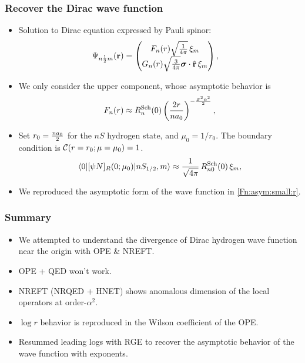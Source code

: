 \begin{frame}
	\frametitle{Recover the Dirac wave function}

	\begin{itemize}
		\item Solution to Dirac equation expressed by Pauli spinor: 
		\begin{align}
				\Psi_{n{1\over 2} m}(\vb{r}) & = \pmqty{ F_{n}(r) \sqrt{\frac{1}{4\pi}}\,\xi_m
			\\
				G_{n}(r)\sqrt{\frac{3}{4\pi}} \bm{\sigma} \cdot \hat{\bf r} \,\xi_m},
		\end{align}
		\item We only consider the upper component, whose asymptotic behavior is 
		\begin{align}
			F_{n}(r)  \approx
			R^{\rm Sch}_{n}(0) \left({2 r\over n a_0}\right)^{-\frac{Z^2\alpha^2}{2}},
			\label{Fn:asym:small:r}
		\end{align}
		\item Set $r_0={n a_0\over 2}$ for the $nS$ hydrogen state, and $\mu_0=1/r_0$.
		The boundary condition is ${\cal C}(r=r_0;\mu=\mu_0)=1$. 
		\begin{align}
			\langle 0\vert [\psi N]_R(0;\mu_0)\vert n S_{1/2},m  \rangle \approx  {1\over \sqrt{4\pi}}\,R_{n0}^{\rm Sch}(0)\,\xi_m,
		\end{align}
		\item We reproduced the asymptotic form of the wave function in \eqref{Fn:asym:small:r}.
	\end{itemize}

\end{frame}

\begin{frame}
	\frametitle{Summary}

	\begin{itemize}
		\item We attempted to understand the divergence of Dirac hydrogen wave function near the origin with OPE \& NREFT. 
		\item OPE + QED won't work. 
		\item NREFT (NRQED + HNET) shows anomalous dimension of the local operators at order-$\alpha^2$.
		\item $\log r$ behavior is reproduced in the Wilson coefficient of the OPE. 
		\item Resummed leading logs with RGE to recover the asymptotic behavior of the wave function with exponents. 
	\end{itemize}

\end{frame}

